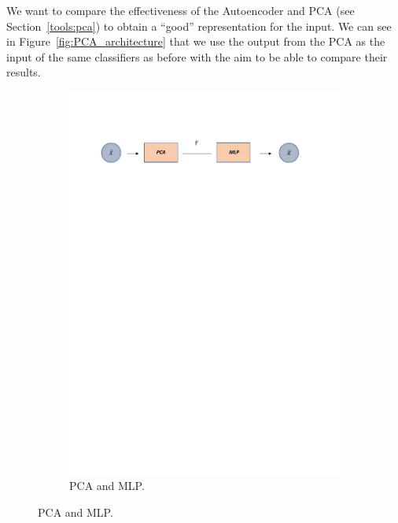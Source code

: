 We want to compare the effectiveness of the Autoencoder and PCA (see Section~\ref{tools:pca}) to obtain a ``good'' representation for the input. 
We can see in Figure~\ref{fig:PCA_architecture} that we use the output from the PCA as the input of the same classifiers as before %
with the aim to be able to compare their results. 
%
\begin{figure}[H]
\begin{subfigure}{1\linewidth}  
 \centering
  \includegraphics[width=\linewidth]{Figuras_tfg/Diagram_pca_mlp}
  \caption{PCA and MLP.}
  \label{fig:FigA_PCA_MLP} 
\end{subfigure}


\end{figure}
